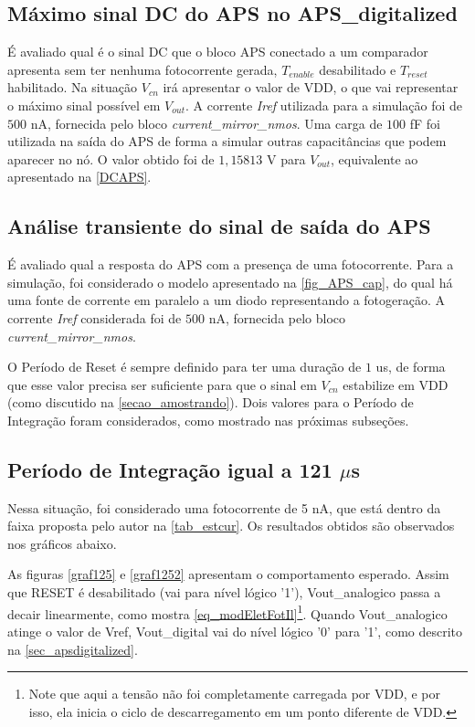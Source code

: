 \subsection{Máximo sinal DC do APS no APS\_digitalized}

É avaliado qual é o sinal DC que o bloco APS conectado a um comparador apresenta sem ter nenhuma fotocorrente gerada, $T_{enable}$ desabilitado e $T_{reset}$ habilitado. Na situação $V_{cn}$ irá apresentar o valor de VDD, o que vai representar o máximo sinal possível em $V_{out}$. A corrente \textit{Iref} utilizada para a simulação foi de $500$ nA, fornecida pelo bloco \textit{current\_mirror\_nmos}. Uma carga de $100$ fF foi utilizada na saída do APS de forma a simular outras capacitâncias que podem aparecer no nó. O valor obtido foi de $1,15813$ V para $V_{out}$, equivalente ao apresentado na \autoref{DCAPS}.

\subsection{Análise transiente do sinal de saída do APS}

É avaliado qual a resposta do APS com a presença de uma fotocorrente. Para a simulação, foi considerado o modelo apresentado na \autoref{fig_APS_cap}, do qual há uma fonte de corrente em paralelo a um diodo representando a fotogeração. A corrente \textit{Iref} considerada foi de $500$ nA, fornecida pelo bloco \textit{current\_mirror\_nmos}.

O Período de Reset é sempre definido para ter uma duração de $1$ us, de forma que esse valor precisa ser suficiente para que o sinal em $V_{cn}$ estabilize em VDD (como discutido na \autoref{secao_amostrando}). Dois valores para o Período de Integração foram considerados, como mostrado nas próximas subseções.

\subsection{Período de Integração igual a 121 $\mu$s}
\label{sub_sec121}

Nessa situação, foi considerado uma fotocorrente de 5 nA, que está dentro da faixa proposta pelo autor na \autoref{tab_estcur}. Os resultados obtidos são observados nos gráficos abaixo.

As figuras \ref{graf125} e \ref{graf1252} apresentam o comportamento esperado. Assim que RESET é desabilitado (vai para nível lógico '1'), Vout\_analogico passa a decair linearmente, como mostra \autoref{eq_modEletFotIl}\footnote{Note que aqui a tensão não foi completamente carregada por VDD, e por isso, ela inicia o ciclo de descarregamento em um ponto diferente de VDD.}. Quando Vout\_analogico atinge o valor de Vref, Vout\_digital vai do nível lógico '0' para '1', como descrito na \autoref{sec_apsdigitalized}.


